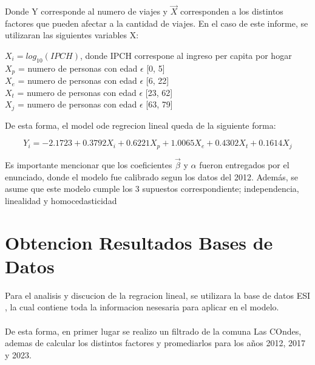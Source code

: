\documentclass[12pt]{article} %
\begin{document}
Donde Y corresponde al numero de viajes y $\vec{X}$ corresponden a los distintos factores que pueden afectar a la cantidad de viajes. En el caso de este informe, se utilizaran las siguientes variables X:

\begin{center}
    $X_i = log_{10}(IPCH)$, donde IPCH correspone al ingreso per capita por hogar\\
    $X_p$ = numero de personas con edad $\epsilon$ [0, 5]\\
    $X_e$ = numero de personas con edad $\epsilon$ [6, 22]\\
    $X_t$ = numero de personas con edad $\epsilon$ [23, 62]\\
    $X_j$ = numero de personas con edad $\epsilon$ [63, 79]\\
\end{center}

De esta forma, el model ode regrecion lineal queda de la siguiente forma:

\begin{equation}
    Y_i = -2.1723 + 0.3792X_i + 0.6221X_p + 1.0065X_e + 0.4302X_t + 0.1614X_j
    \label{eq:regrecion}
\end{equation}

Es importante mencionar que los coeficientes $\vec{\beta}$ y $\alpha$ fueron entregados por el enunciado, donde el modelo fue calibrado segun los datos del 2012. Además, se asume que este modelo cumple los 3 supuestos correspondiente; independencia, linealidad y homocedasticidad

\section{Obtencion Resultados Bases de Datos}

Para el analisis y  discucion de la regracion lineal, se utilizara la base de datos ESI \textbf{\cite{esi}}, la cual contiene toda la informacion nesesaria para aplicar en el modelo.
\\ \\
De esta forma, en primer lugar se realizo un filtrado de la comuna Las COndes, ademas de calcular los distintos factores y promediarlos para los años 2012, 2017 y 2023.
\end{document}
